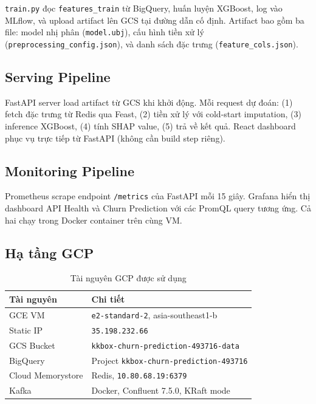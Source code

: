 \documentclass[conference]{IEEEtran}
\begin{document}
\texttt{train.py} đọc \texttt{features\_train} từ BigQuery, huấn luyện XGBoost,
log vào MLflow, và upload artifact lên GCS tại đường dẫn cố định. Artifact
bao gồm ba file: model nhị phân (\texttt{model.ubj}), cấu hình tiền xử lý
(\texttt{preprocessing\_config.json}), và danh sách đặc trưng
(\texttt{feature\_cols.json}).

\subsection{Serving Pipeline}

FastAPI server load artifact từ GCS khi khởi động. Mỗi request dự đoán:
(1) fetch đặc trưng từ Redis qua Feast, (2) tiền xử lý với cold-start
imputation, (3) inference XGBoost, (4) tính SHAP value, (5) trả về kết quả.
React dashboard phục vụ trực tiếp từ FastAPI (không cần build step riêng).

\subsection{Monitoring Pipeline}

Prometheus scrape endpoint \texttt{/metrics} của FastAPI mỗi 15 giây. Grafana
hiển thị dashboard API Health và Churn Prediction với các PromQL query tương
ứng. Cả hai chạy trong Docker container trên cùng VM.

\subsection{Hạ tầng GCP}

\begin{table}[htbp]
\caption{Tài nguyên GCP được sử dụng}
\label{tab:gcp}
\centering
\begin{tabular}{ll}
\toprule
\textbf{Tài nguyên} & \textbf{Chi tiết} \\
\midrule
GCE VM & \texttt{e2-standard-2}, asia-southeast1-b \\
Static IP & \texttt{35.198.232.66} \\
GCS Bucket & \texttt{kkbox-churn-prediction-493716-data} \\
BigQuery & Project \texttt{kkbox-churn-prediction-493716} \\
Cloud Memorystore & Redis, \texttt{10.80.68.19:6379} \\
Kafka & Docker, Confluent 7.5.0, KRaft mode \\
\bottomrule
\end{tabular}
\end{table}
\end{document}
